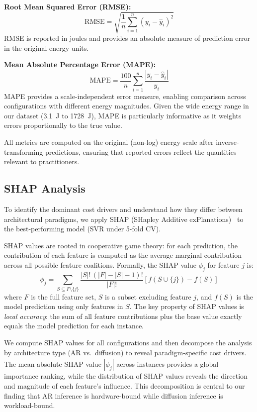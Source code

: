\documentclass{ieeeaccess}
\begin{document}
\textbf{Root Mean Squared Error (RMSE):}
\begin{equation}
\text{RMSE} = \sqrt{\frac{1}{n}\sum_{i=1}^{n}(y_i - \hat{y}_i)^2}
\label{eq:rmse}
\end{equation}
RMSE is reported in joules and provides an absolute measure of prediction error in the original energy units.

\textbf{Mean Absolute Percentage Error (MAPE):}
\begin{equation}
\text{MAPE} = \frac{100}{n}\sum_{i=1}^{n}\frac{|y_i - \hat{y}_i|}{y_i}
\label{eq:mape}
\end{equation}
MAPE provides a scale-independent error measure, enabling comparison across configurations with different energy magnitudes.
Given the wide energy range in our dataset (\SI{3.1}{\joule} to \SI{1728}{\joule}), MAPE is particularly informative as it weights errors proportionally to the true value.

All metrics are computed on the original (non-log) energy scale after inverse-transforming predictions, ensuring that reported errors reflect the quantities relevant to practitioners.

\subsection{SHAP Analysis}
\label{sec:shap_method}
To identify the dominant cost drivers and understand how they differ between architectural paradigms, we apply SHAP (SHapley Additive exPlanations)~\cite{lundberg2017shap} to the best-performing model (SVR under 5-fold CV).

SHAP values are rooted in cooperative game theory: for each prediction, the contribution of each feature is computed as the average marginal contribution across all possible feature coalitions.
Formally, the SHAP value $\phi_j$ for feature $j$ is:
\begin{equation}
\phi_j = \sum_{S \subseteq F \setminus \{j\}} \frac{|S|!\,(|F|-|S|-1)!}{|F|!} \left[ f(S \cup \{j\}) - f(S) \right]
\label{eq:shap}
\end{equation}
where $F$ is the full feature set, $S$ is a subset excluding feature $j$, and $f(S)$ is the model prediction using only features in $S$.
The key property of SHAP values is \emph{local accuracy}: the sum of all feature contributions plus the base value exactly equals the model prediction for each instance.

We compute SHAP values for all configurations and then decompose the analysis by architecture type (AR vs.\ diffusion) to reveal paradigm-specific cost drivers.
The mean absolute SHAP value $\overline{|\phi_j|}$ across instances provides a global importance ranking, while the distribution of SHAP values reveals the direction and magnitude of each feature's influence.
This decomposition is central to our finding that AR inference is hardware-bound while diffusion inference is workload-bound.
\end{document}
